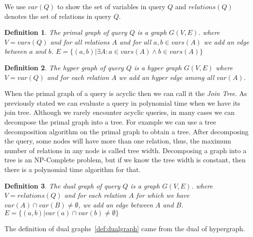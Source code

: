 \documentclass[12pt]{article}
\newtheorem{definition}{Definition}
\begin{document}
We use $var(Q)$ to show the set of variables in query $Q$ and $relations(Q)$ denotes the set of relations in query $Q$.
\begin{definition}
\label{def:primalgraph}
The primal graph of query $Q$ is a graph $G(V,E)$. where $V=vars(Q)$ and for all relations $A$ and for all $a,b\in vars(A)$ we add an edge between $a$ and $b$. $E=\{(a,b)|\exists A: a\in vars(A)\land b\in vars(A)\}$
\end{definition}
\begin{definition}
\label{def:hypergraph} 
The hyper graph of query $Q$ is a hyper graph $G(V,E)$ where $V=var(Q)$ and for each relation $A$ we add an hyper edge among all $var(A)$.
\end{definition}
When the primal graph of a query is acyclic then we can call it the \emph{Join Tree}. As previously stated we can evaluate a query in polynomial time when we have its join tree. Although we rarely encounter acyclic queries, in many cases we can decompose the primal graph into a tree. For example we can use a tree decomposition algorithm on the primal graph to obtain a tree. After decomposing the query, some nodes will have more than one relation, thus, the maximum number of relations in any node is called tree width. 
Decomposing a graph into a tree is an NP-Complete problem, but if we know the tree width is constant, then there is a polynomial time algorithm for that. \par
\begin{definition}
\label{def:dualgraph}
The dual graph of query $Q$ is a graph $G(V,E)$. where $V=relations(Q)$ and for each relation $A$ for which we have $var(A)\cap var(B)\neq \emptyset$, we add an edge between $A$ and $B$. $E=\{(a,b)|var(a)\cap var(b)\neq\emptyset\}$
\end{definition}
The definition of dual graphs~\eqref{def:dualgraph} came from the dual of hypergraph. 
\end{document}
